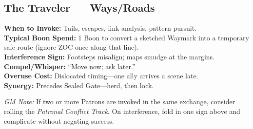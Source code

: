 \documentclass[11pt]{article}
\begin{document}
\subsection*{The Traveler — Ways/Roads}
\textbf{When to Invoke:} Tails, escapes, link-analysis, pattern pursuit.\\
\textbf{Typical Boon Spend:} 1 Boon to convert a sketched Waymark into a temporary safe route (ignore ZOC once along that line).\\
\textbf{Interference Sign:} Footsteps misalign; maps smudge at the margins.\\
\textbf{Compel/Whisper:} “Move now; ask later.”\\
\textbf{Overuse Cost:} Dislocated timing—one ally arrives a scene late.\\
\textbf{Synergy:} Precedes Sealed Gate—herd, then lock.

\bigskip
\noindent\emph{GM Note:} If two or more Patrons are invoked in the same exchange, consider rolling the \textit{Patronal Conflict Track}. On interference, fold in one sign above and complicate without negating success.
\end{document}

